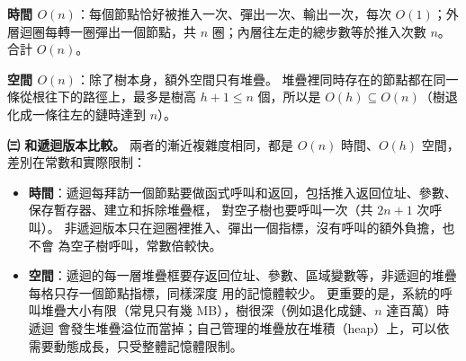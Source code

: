\begin{pastsoln}
\textbf{時間 $O(n)$}：每個節點恰好被推入一次、彈出一次、輸出一次，每次 $O(1)$；外層迴圈每轉一圈彈出一個節點，共
$n$ 圈；內層往左走的總步數等於推入次數 $n$。 合計 $O(n)$。

\textbf{空間 $O(n)$}：除了樹本身，額外空間只有堆疊。 堆疊裡同時存在的節點都在同一條從根往下的路徑上，最多是樹高
$h + 1 \le n$ 個，所以是 $O(h) \subseteq O(n)$（樹退化成一條往左的鏈時達到 $n$）。

\textbf{㈢ 和遞迴版本比較。} 兩者的漸近複雜度相同，都是 $O(n)$ 時間、$O(h)$ 空間，差別在常數和實際限制：
\begin{itemize}
\item \textbf{時間}：遞迴每拜訪一個節點要做函式呼叫和返回，包括推入返回位址、參數、保存暫存器、建立和拆除堆疊框，
對空子樹也要呼叫一次（共 $2n + 1$ 次呼叫）。 非遞迴版本只在迴圈裡推入、彈出一個指標，沒有呼叫的額外負擔，也不會
為空子樹呼叫，常數倍較快。
\item \textbf{空間}：遞迴的每一層堆疊框要存返回位址、參數、區域變數等，非遞迴的堆疊每格只存一個節點指標，同樣深度
用的記憶體較少。 更重要的是，系統的呼叫堆疊大小有限（常見只有幾 MB），樹很深（例如退化成鏈、$n$ 達百萬）時遞迴
會發生堆疊溢位而當掉；自己管理的堆疊放在堆積（heap）上，可以依需要動態成長，只受整體記憶體限制。
\end{itemize}
\end{pastsoln}
